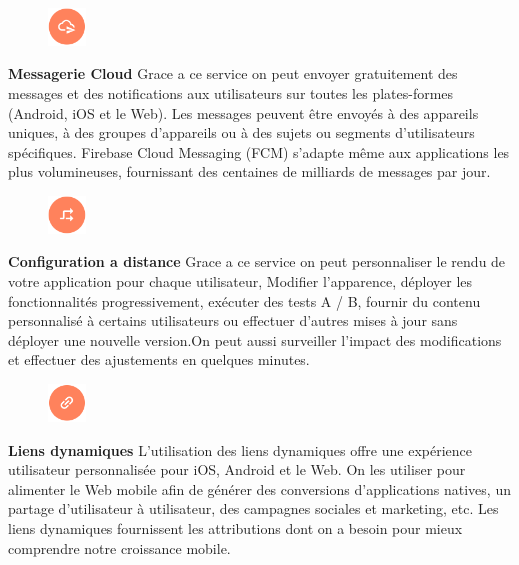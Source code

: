 \begin{figure}
    \includegraphics[width=1cm]{images/Chapitre2/Firebase_services/cloud_messaging.PNG}
        \end{figure}
\textbf{Messagerie Cloud} Grace a ce service on peut envoyer gratuitement des messages
et des notifications aux utilisateurs sur toutes les plates-formes (Android, iOS et 
le Web). Les messages peuvent être envoyés à des appareils uniques, à des groupes 
d'appareils ou à des sujets ou segments d'utilisateurs spécifiques. Firebase Cloud Messaging
(FCM) s'adapte même aux applications les plus volumineuses, fournissant des centaines de
milliards de messages par jour. \medskip 

\begin{figure}
    \includegraphics[width=1cm]{images/Chapitre2/Firebase_services/remote_config.PNG}
        \end{figure}
\textbf{Configuration a distance} Grace a ce service on peut personnaliser le rendu de
votre application pour chaque utilisateur, Modifier l'apparence, déployer les 
fonctionnalités progressivement, exécuter des tests A / B, fournir du contenu personnalisé
à certains utilisateurs ou effectuer d'autres mises à jour sans déployer une nouvelle
version.On peut aussi surveiller l'impact des modifications et effectuer des ajustements
en quelques minutes.\medskip 

\begin{figure}
    \includegraphics[width=1cm]{images/Chapitre2/Firebase_services/dynamic_links.PNG}
        \end{figure}
\textbf{Liens dynamiques} L'utilisation des liens dynamiques offre une expérience utilisateur
personnalisée pour iOS, Android et le Web. On les utiliser pour alimenter le Web mobile afin
de générer des conversions d'applications natives, un partage d'utilisateur à utilisateur,
des campagnes sociales et marketing, etc. Les liens dynamiques fournissent les attributions
dont on a besoin pour mieux comprendre notre croissance mobile.\medskip 
